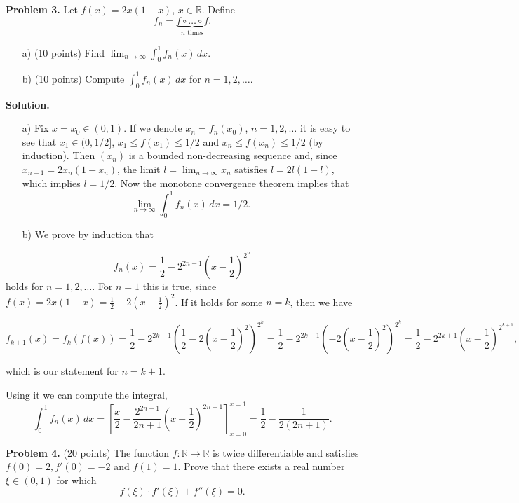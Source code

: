\documentclass{article}
\begin{document}
\textbf{Problem 3.} Let \( f(x) = 2x(1 - x) \), \( x \in \mathbb{R} \). Define
\[
f_n = \underbrace{f \circ \ldots \circ f}_{n \text{ times}}.
\]

\begin{enumerate}
    \item[a)] (10 points) Find \(\displaystyle\lim_{n\to\infty} \int_{0}^{1} f_n(x) \, dx\).
    \item[b)] (10 points) Compute \(\int_{0}^{1} f_n(x) \, dx\) for \( n = 1,2,\ldots \).
\end{enumerate}

\noindent \textbf{Solution.}
\begin{enumerate}
    \item[a)] Fix \( x = x_0 \in (0,1) \). If we denote \( x_n = f_n(x_0) \), \( n = 1,2,\ldots \) it is easy to see that \( x_1 \in (0,1/2] \), \( x_1 \leq f(x_1) \leq 1/2 \) and \( x_n \leq f(x_n) \leq 1/2 \) (by induction). Then \( (x_n) \) is a bounded non-decreasing sequence and, since \( x_{n+1} = 2x_n(1 - x_n) \), the limit \( l = \lim_{n\to\infty} x_n \) satisfies \( l = 2l(1 - l) \), which implies \( l = 1/2 \). Now the monotone convergence theorem implies that
    \[
    \lim_{n\to\infty} \int_{0}^{1} f_n(x) \, dx = 1/2.
    \]
    \item[b)] We prove by induction that
\end{enumerate}
\[
f_n(x) = \frac{1}{2} - 2^{2n-1} \left( x - \frac{1}{2} \right)^{2^n}
\]
holds for \( n = 1,2,\ldots \).
For \( n = 1 \) this is true,
since \( f(x) = 2x(1 - x) = \frac{1}{2} - 2(x - \frac{1}{2})^2 \).
If it holds for some \( n = k \), then we have

\[
f_{k+1}(x) = f_k(f(x)) = \frac{1}{2} - 2^{2k-1}\left(\frac{1}{2} - 2\left(x - \frac{1}{2}\right)^2\right)^{2^k} = \frac{1}{2} - 2^{2k-1}\left(-2(x - \frac{1}{2})^2\right)^{2^k} = \frac{1}{2} - 2^{2k+1}\left(x - \frac{1}{2}\right)^{2^{k+1}},
\]

which is our statement for \( n = k + 1 \).

Using it we can compute the integral,
\[
\int_{0}^{1} f_n(x) \, dx = \left[ \frac{x}{2} - \frac{2^{2n-1}}{2n+1}\left(x - \frac{1}{2}\right)^{2n+1} \right]_{x=0}^{x=1} = \frac{1}{2} - \frac{1}{2(2n+1)}.
\]

\textbf{Problem 4.} (20 points) The function \( f : \mathbb{R} \rightarrow \mathbb{R} \) is twice differentiable and satisfies \( f(0) = 2, f'(0) = -2 \) and \( f(1) = 1 \). Prove that there exists a real number \( \xi \in (0, 1) \) for which
\[ f(\xi) \cdot f'(\xi) + f''(\xi) = 0. \]
\end{document}
